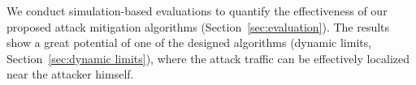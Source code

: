 We conduct simulation-based evaluations to quantify the effectiveness of our proposed attack mitigation algorithms (Section~\ref{sec:evaluation}).
The results show a great potential of one of the designed algorithms (dynamic limits, Section~\ref{sec:dynamic limits}), where the attack traffic can be effectively localized near the attacker himself.



